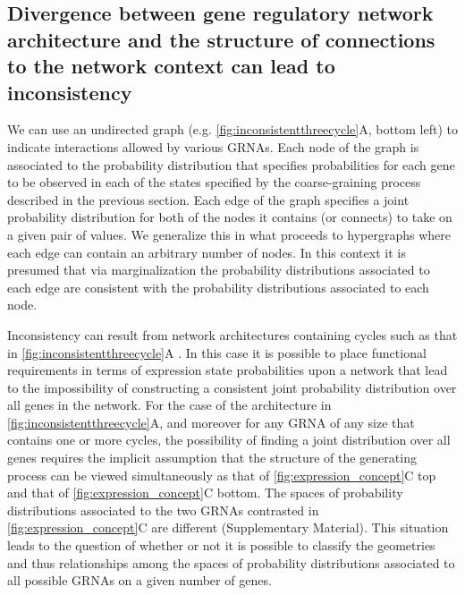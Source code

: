 \subsection{Divergence between gene regulatory network architecture and the structure of connections to the network context can lead to inconsistency}
We can use an undirected graph (e.g. \ref{fig:inconsistentthreecycle}A, bottom left) to indicate interactions allowed by various GRNAs. Each node of the graph is associated to the probability distribution that specifies probabilities for each gene to be observed in each of the states specified by the coarse-graining process described in the previous section. Each edge of the graph specifies a joint probability distribution for both of the nodes it contains (or connects) to take on a given pair of values. We generalize this in what proceeds to hypergraphs where each edge can contain an arbitrary number of nodes. In this context it is presumed that via marginalization the probability distributions associated to each edge are consistent with the probability distributions associated to each node.

Inconsistency can result from network architectures containing cycles such as that in \ref{fig:inconsistentthreecycle}A \cite{Lauritzen1996,Geiger2006,Wainwright2007}. In this case it is possible to place functional requirements in terms of expression state probabilities upon a network that lead to the impossibility of constructing a consistent joint probability distribution over all genes in the network. For the case of the architecture in \ref{fig:inconsistentthreecycle}A, and moreover for any GRNA of any size that contains one or more cycles, the possibility of finding a joint distribution over all genes requires the implicit assumption that the structure of the generating process can be viewed simultaneously as that of \ref{fig:expression_concept}C top and that of \ref{fig:expression_concept}C bottom. The spaces of probability distributions associated to the two GRNAs contrasted in \ref{fig:expression_concept}C are different (Supplementary Material). This situation leads to the question of whether or not it is possible to classify the geometries and thus relationships among the spaces of probability distributions associated to all possible GRNAs on a given number of genes.

